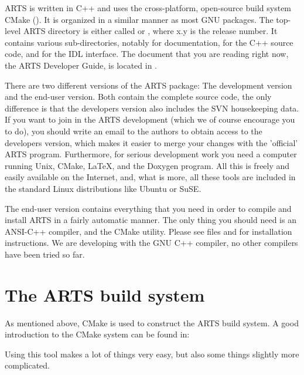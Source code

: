 ARTS is written in C++ and uses the cross-platform, open-source build system
CMake (). It is organized in a similar
manner as most GNU packages. The top-level ARTS directory is either called
 or , where x.y is the release number. It
contains various sub-directories, notably  for documentation,
 for the C++ source code, and  for the IDL
interface. The document that you are reading right now, the ARTS Developer
Guide, is located in .

There are two different versions of the ARTS package: The development
version and the end-user version. Both contain the complete source
code, the only difference is that the developers version also includes
the SVN housekeeping data. If you want to join in the ARTS development
(which we of course encourage you to do), you should write an email to
the authors to obtain access to the developers version, which makes it
easier to merge your changes with the 'official' ARTS program.
Furthermore, for serious development work you need a computer running
Unix, CMake, LaTeX, and the Doxygen program.  All
this is freely and easily available on the Internet, and, what is
more, all these tools are included in the standard Linux
distributions like Ubuntu or SuSE.

The end-user version contains everything that you need in order to
compile and install ARTS in a fairly automatic manner. The only thing
you should need is an ANSI-C++ compiler, and the CMake utility. Please
see files  and  for
installation instructions. We are developing with the GNU C++ compiler,
no other compilers have been tried so far.

\section{The ARTS build system}

As mentioned above, CMake is used to construct the ARTS
build system. A good introduction to the CMake system can be found in:
\begin{quote}
  \footnotesize
\end{quote}
Using this tool makes a lot of things very easy, but also some
things slightly more complicated.


